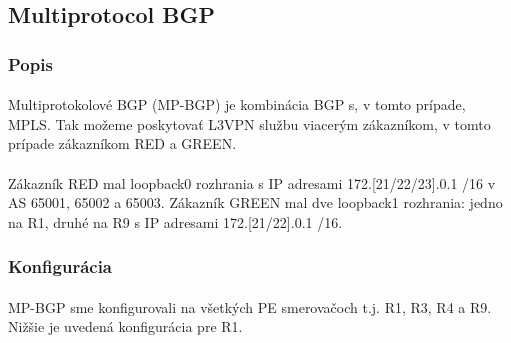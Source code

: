 \documentclass[12pt,twoside,a4paper]{report}
\begin{document}
\subsection{Multiprotocol BGP}
\subsubsection{Popis}
\paragraph{}
Multiprotokolové BGP (MP-BGP) je kombinácia BGP s, v tomto prípade, MPLS. Tak možeme poskytovať L3VPN službu viacerým zákazníkom, v tomto prípade zákazníkom RED a GREEN.

\paragraph{}
Zákazník RED mal loopback0 rozhrania s IP adresami 172.[21/22/23].0.1 /16 v AS 65001, 65002 a 65003. Zákazník GREEN mal dve loopback1 rozhrania: jedno na R1, druhé na R9 s IP adresami 172.[21/22].0.1 /16.

\subsubsection{Konfigurácia}
\paragraph{}
MP-BGP sme konfigurovali na všetkých PE smerovačoch t.j. R1, R3, R4 a R9. Nižšie je uvedená konfigurácia pre R1.
\end{document}
